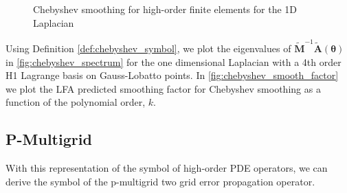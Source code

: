 \documentclass[review]{siamart190516}
\begin{document}
\begin{figure}[!tbp]
  \centering
  \hfill
  \caption{Chebyshev smoothing for high-order finite elements for the 1D Laplacian}
\end{figure}

Using Definition \ref{def:chebyshev_symbol}, we plot the eigenvalues of $\tilde{\mathbf{M}}^{-1} \tilde{\mathbf{A}} \left( \boldsymbol{\theta} \right)$ in \cref{fig:chebyshev_spectrum} for the one dimensional Laplacian with a 4th order H1 Lagrange basis on Gauss-Lobatto points.
In \cref{fig:chebyshev_smooth_factor} we plot the LFA predicted smoothing factor for Chebyshev smoothing as a function of the polynomial order, $k$.

\subsection{P-Multigrid}\label{sec:multigrid}

With this representation of the symbol of high-order PDE operators, we can derive the symbol of the p-multigrid two grid error propagation operator.
\end{document}
